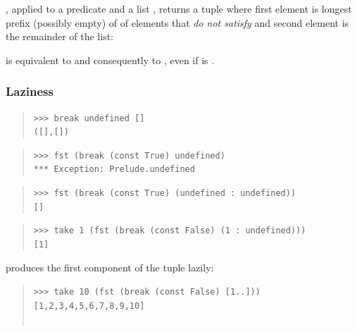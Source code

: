 \begin{haddockdesc}
\item[\begin{tabular}{@{}l}
break :: (a -> Bool) -> {\char 91}a{\char 93} -> ({\char 91}a{\char 93}, {\char 91}a{\char 93})
\end{tabular}]
{\haddockbegindoc
{}, applied to a predicate  and a list , returns a tuple where
 first element is longest prefix (possibly empty) of  of elements that
 \emph{do not satisfy}  and second element is the remainder of the list:\par
{}  is equivalent to 
 and consequently to ,
 even if  is .\par
\subsubsection*{\textbf{Laziness}}
\begin{quote}
{\haddockverb\begin{verbatim}
>>> break undefined []
([],[])

\end{verbatim}}
\end{quote}
\begin{quote}
{\haddockverb\begin{verbatim}
>>> fst (break (const True) undefined)
*** Exception: Prelude.undefined

\end{verbatim}}
\end{quote}
\begin{quote}
{\haddockverb\begin{verbatim}
>>> fst (break (const True) (undefined : undefined))
[]

\end{verbatim}}
\end{quote}
\begin{quote}
{\haddockverb\begin{verbatim}
>>> take 1 (fst (break (const False) (1 : undefined)))
[1]

\end{verbatim}}
\end{quote}
 produces the first component of the tuple lazily:\par
\begin{quote}
{\haddockverb\begin{verbatim}
>>> take 10 (fst (break (const False) [1..]))
[1,2,3,4,5,6,7,8,9,10]


\end{verbatim}}
\end{quote}}
\end{haddockdesc}
